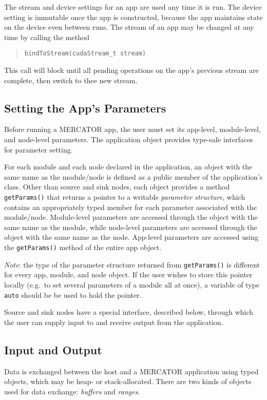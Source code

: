 \documentclass[11pt]{article}
\begin{document}
The stream and device settings for an app are used any time it is run.
The device setting is immutable once the app is constructed, because
the app maintains state on the device even between runs.  The stream
of an app may be changed at any time by calling the method
\begin{quote}
\texttt{bindToStream(cudaStream_t stream)}
\end{quote}
This call will block until all pending operations on the app's
previous stream are complete, then switch to thee new stream.

\subsection{Setting the App's Parameters}

Before running a MERCATOR app, the user must set its app-level,
module-level, and node-level parameters.  The application object
provides type-safe interfaces for parameter setting.

For each module and each node declared in the application, an object
with the same name as the module/node is defined as a public member of
the application's class.  Other than source and sink nodes, each
object provides a method \texttt{getParams()} that returns a pointer
to a writable \emph{parameter structure}, which contains an
appropriately typed member for each parameter associated with the
module/node.  Module-level parameters are accessed through the object
with the same name as the module, while node-level parameters are
accessed through the object with the same name as the node.  App-level
parameters are accessed using the \texttt{getParams()} method of the
entire app object.

\textit{Note}: the type of the parameter structure returned from
\texttt{getParams()} is different for every app, module, and node
object.  If the user wishes to store this pointer locally (e.g.\ to
set several parameters of a module all at once), a variable of type
\texttt{auto} should be be used to hold the pointer.

Source and sink nodes have a special interface, described below,
through which the user can supply input to and receive output from the
application.

\subsection{Input and Output}

Data is exchanged between the host and a MERCATOR application using
typed objects, which may be heap- or stack-allocated.  There are two
kinds of objects used for data exchange: \textit{buffers} and
\textit{ranges}.
\end{document}
